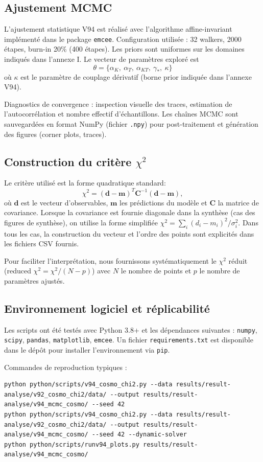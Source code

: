 \documentclass[11pt,a4paper]{article}
\newcommand{\kent}{\kappa} %
\begin{document}
\subsection{Ajustement MCMC}
L'ajustement statistique V94 est réalisé avec l'algorithme affine-invariant implémenté dans le package \texttt{emcee}. Configuration utilisée : 32 walkers, 2000 étapes, burn-in 20\% (400 étapes). Les priors sont uniformes sur les domaines indiqués dans l'annexe I. Le vecteur de paramètres exploré est
\[\theta = \{\alpha_K,\ \alpha_T,\ \alpha_{KT},\ \gamma_*,\ \kent\}\]
où $\kent$ est le paramètre de couplage dérivatif (borne prior indiquée dans l'annexe V94).

Diagnostics de convergence : inspection visuelle des traces, estimation de l'autocorrélation et nombre effectif d'échantillons. Les chaînes MCMC sont sauvegardées en format NumPy (fichier \texttt{.npy}) pour post-traitement et génération des figures (corner plots, traces).

\subsection{Construction du critère $\chi^2$}
Le critère utilisé est la forme quadratique standard:
\[
\chi^2=(\mathbf{d}-\mathbf{m})^T\mathbf{C}^{-1}(\mathbf{d}-\mathbf{m}),
\]
où $\mathbf{d}$ est le vecteur d'observables, $\mathbf{m}$ les prédictions du modèle et $\mathbf{C}$ la matrice de covariance. Lorsque la covariance est fournie diagonale dans la synthèse (cas des figures de synthèse), on utilise la forme simplifiée $\chi^2=\sum_i (d_i-m_i)^2/\sigma_i^2$. Dans tous les cas, la construction du vecteur et l'ordre des points sont explicités dans les fichiers CSV fournis.

Pour faciliter l'interprétation, nous fournissons systématiquement le $\chi^2$ réduit (reduced $\chi^2 = \chi^2/(N-p)$) avec $N$ le nombre de points et $p$ le nombre de paramètres ajustés.

\subsection{Environnement logiciel et réplicabilité}
Les scripts ont été testés avec Python 3.8+ et les dépendances suivantes : \texttt{numpy}, \texttt{scipy}, \texttt{pandas}, \texttt{matplotlib}, \texttt{emcee}. Un fichier \texttt{requirements.txt} est disponible dans le dépôt pour installer l'environnement via \texttt{pip}.

Commandes de reproduction typiques :
\begin{verbatim}
python python/scripts/v94_cosmo_chi2.py --data results/result-analyse/v92_cosmo_chi2/data/ --output results/result-analyse/v94_mcmc_cosmo/ --seed 42
python python/scripts/v94_cosmo_chi2.py --data results/result-analyse/v92_cosmo_chi2/data/ --output results/result-analyse/v94_mcmc_cosmo/ --seed 42 --dynamic-solver
python python/scripts/runv94_plots.py results/result-analyse/v94_mcmc_cosmo/
\end{verbatim}
\end{document}
